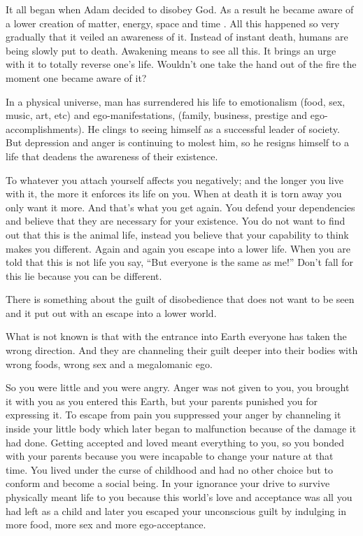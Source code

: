 \documentclass[landscape,twocolumn,letterpaper]{article}
\newcommand{\mest}{matter, energy, space and time }
\begin{document}
It all began when Adam decided to disobey God. As a result he became
aware of a lower creation of \mest. All this happened so very
gradually that it veiled an awareness of it. Instead of instant death,
humans are being slowly put to death. Awakening means to see all
this. It brings an urge with it to totally reverse one's
life. Wouldn't one take the hand out of the fire the moment one became
aware of it?

In a physical universe, man has surrendered his life to emotionalism
(food, sex, music, art, etc) and ego-manifestations, (family,
business, prestige and ego-accomplishments). He clings to seeing
himself as a successful leader of society. But depression and anger is
continuing to molest him, so he resigns himself to a life that deadens
the awareness of their existence.

To whatever you attach yourself affects you negatively; and the longer
you live with it, the more it enforces its life on you. When at death
it is torn away you only want it more. And that's what you get
again. You defend your dependencies and believe that they are
necessary for your existence. You do not want to find out that this is
the animal life, instead you believe that your capability to think
makes you different. Again and again you escape into a lower
life. When you are told that this is not life you say, ``But everyone
is the same as me!'' Don't fall for this lie because you can be
different.

There is something about the guilt of disobedience that does not want
to be seen and it put out with an escape into a lower world.

What is not known is that with the entrance into Earth everyone has
taken the wrong direction. And they are channeling their guilt deeper
into their bodies with wrong foods, wrong sex and a megalomanic ego.

So you were little and you were angry. Anger was not given to you, you
brought it with you as you entered this Earth, but your parents
punished you for expressing it. To escape from pain you suppressed
your anger by channeling it inside your little body which later began
to malfunction because of the damage it had done. Getting accepted and
loved meant everything to you, so you bonded with your parents because
you were incapable to change your nature at that time. You lived under
the curse of childhood and had no other choice but to conform and
become a social being. In your ignorance your drive to survive
physically meant life to you because this world's love and acceptance
was all you had left as a child and later you escaped your unconscious
guilt by indulging in more food, more sex and more ego-acceptance.
\end{document}
